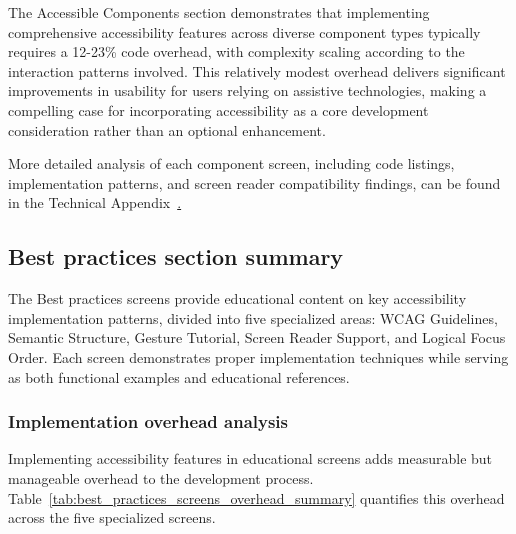 The Accessible Components section demonstrates that implementing comprehensive accessibility features across diverse component types typically requires a 12-23\% code overhead, with complexity scaling according to the interaction patterns involved. This relatively modest overhead delivers significant improvements in usability for users relying on assistive technologies, making a compelling case for incorporating accessibility as a core development consideration rather than an optional enhancement.

More detailed analysis of each component screen, including code listings, implementation patterns, and screen reader compatibility findings, can be found in the {Technical Appendix}~\href{https://github.com/gabrielrovesti/AccessibleHub/blob/main/Technical\%20Thesis\%20Appendix/AccessibleHub\%20-\%20Extended\%20screen\%20analysis.pdf}.

\subsection{Best practices section summary}
\label{subsec:best-practices-section-summary}
The Best practices screens provide educational content on key accessibility implementation patterns, divided into five specialized areas: WCAG Guidelines, Semantic Structure, Gesture Tutorial, Screen Reader Support, and Logical Focus Order. Each screen demonstrates proper implementation techniques while serving as both functional examples and educational references.

\subsubsection{Implementation overhead analysis}
\label{subsubsec:best-practices-screens-overhead-summary}
Implementing accessibility features in educational screens adds measurable but manageable overhead to the development process. Table~\ref{tab:best_practices_screens_overhead_summary} quantifies this overhead across the five specialized screens.

